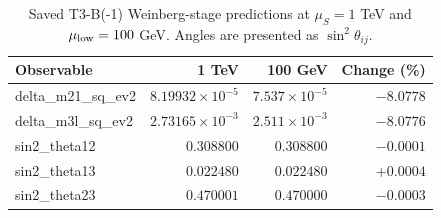 \begin{table}[htbp]
\centering
\caption{Saved T3-B(-1) Weinberg-stage predictions at $\mu_S=1$ TeV and $\mu_{\rm low}=100$ GeV. Angles are presented as $\sin^2\theta_{ij}$.}
\label{tab:t3-weinberg-endpoints}
\begin{tabular}{lrrr}
\toprule
Observable & 1 TeV & 100 GeV & Change (\%) \\
\midrule
delta\_m21\_sq\_ev2 & $8.19932\times10^{-5}$ & $7.537\times10^{-5}$ & $-8.0778$ \\
delta\_m3l\_sq\_ev2 & $2.73165\times10^{-3}$ & $2.511\times10^{-3}$ & $-8.0776$ \\
sin2\_theta12 & $0.308800$ & $0.308800$ & $-0.0001$ \\
sin2\_theta13 & $0.022480$ & $0.022480$ & $+0.0004$ \\
sin2\_theta23 & $0.470001$ & $0.470000$ & $-0.0003$ \\
\bottomrule
\end{tabular}
\end{table}
